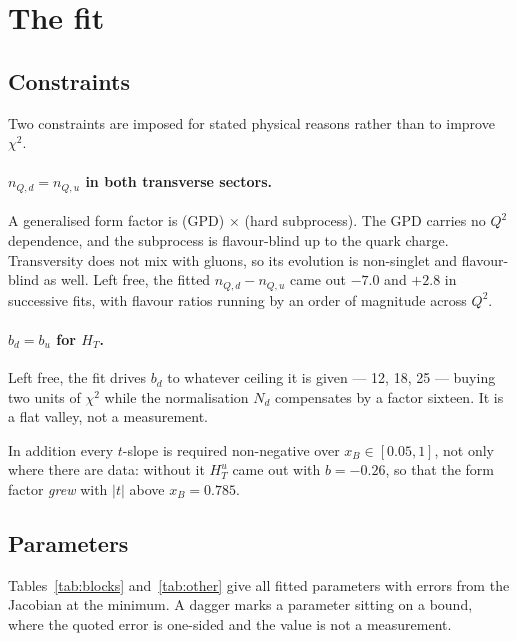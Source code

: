 \documentclass[11pt,a4paper]{article}
\begin{document}
\begin{table}[htb]
\centering\small
\caption{Fitted normalisations.}
\label{tab:norms}

\end{table}

\section{The fit}

\subsection{Constraints}

Two constraints are imposed for stated physical reasons rather than to improve
$\chi^2$.

\paragraph{$n_{Q,d} = n_{Q,u}$ in both transverse sectors.}  A generalised form
factor is (GPD) $\times$ (hard subprocess).  The GPD carries no $Q^2$
dependence, and the subprocess is flavour-blind up to the quark charge.
Transversity does not mix with gluons, so its evolution is non-singlet and
flavour-blind as well.  Left free, the fitted $n_{Q,d} - n_{Q,u}$ came out
$-7.0$ and $+2.8$ in successive fits, with flavour ratios running by an order
of magnitude across $Q^2$.

\paragraph{$b_d = b_u$ for $H_T$.}  Left free, the fit drives $b_d$ to whatever
ceiling it is given --- 12, 18, 25 --- buying two units of $\chi^2$ while the
normalisation $N_d$ compensates by a factor sixteen.  It is a flat valley, not
a measurement.

In addition every $t$-slope is required non-negative over $x_B \in [0.05,1]$,
not only where there are data: without it $H_T^u$ came out with $b=-0.26$, so
that the form factor \emph{grew} with $|t|$ above $x_B = 0.785$.

\subsection{Parameters}

Tables~\ref{tab:blocks} and~\ref{tab:other} give all \npar{} fitted
parameters with errors from the Jacobian at the minimum.  A dagger marks a
parameter sitting on a bound, where the quoted error is one-sided and the value
is not a measurement.
\end{document}
